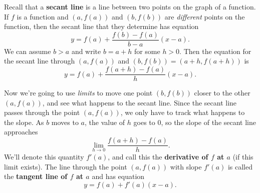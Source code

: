 \documentclass{article}
\theoremstyle{definition}
\theoremstyle{definition}
\begin{document}
\begin{multicols}{2}

Recall that a \textbf{secant line} is a line between two points on the graph of a function. If $f$ is a function and $(a,f(a))$ and $(b,f(b))$ are \textit{different} points on the function, then the secant line that they determine has equation
$$y=f(a) + \frac{f(b)-f(a)}{b-a}(x-a).$$
We can assume $b>a$ and write $b=a+h$ for some $h>0$. Then the equation for the secant line through $(a,f(a))$ and $(b,f(b))=(a+h,f(a+h))$ is
$$y=f(a) + \frac{f(a+h)-f(a)}{h}(x-a).$$


Now we're going to use \textit{limits} to move one point $(b,f(b))$ closer to the other $(a,f(a))$, and see what happens to the secant line. Since the secant line passes through the point $(a,f(a))$, we only have to track what happens to the slope. As $b$ moves to $a$, the value of $h$ goes to $0$, so the slope of the secant line approaches
$$\lim_{h\to 0}\frac{f(a+h)-f(a)}{h}.$$
We'll denote this quantity $f'(a)$, and call this the \textbf{derivative of $f$ at $a$} (if this limit exists). The line through the point $(a,f(a))$ with slope $f'(a)$ is called the \textbf{tangent line of $f$ at $a$} and has equation
$$y=f(a)+f'(a)(x-a).$$

\columnbreak

\end{multicols}
\end{document}

